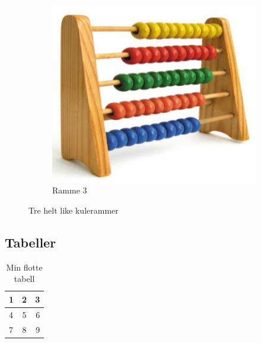 \documentclass[a4paper]{article}
\begin{document}
\begin{figure}[h]
\begin{subfigure}[b]{0.3\linewidth}
        \label{fig:ramme2}
    \end{subfigure}
    ~ 
    \begin{subfigure}[b]{0.3\linewidth}
        \includegraphics[width=\textwidth]{kuleramme}
        \caption{Ramme 3}
        \label{fig:ramme3}
    \end{subfigure}
    \caption{Tre helt like kulerammer}\label{fig:animals}
\end{figure}

\pagebreak

\subsection{Tabeller}


\begin{table}[h]
    \centering
    \begin{tabular}{ l | c | r }
      1 & 2 & 3 \\ \hline
      4 & 5 & 6 \\ \hline
      7 & 8 & 9 \\ 
    \end{tabular}
    \caption{Min flotte tabell}
    \label{tab:tabell1}
\end{table}
\end{document}
